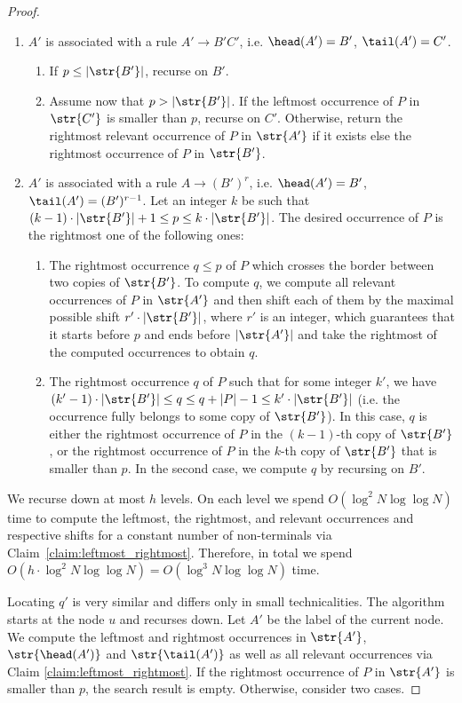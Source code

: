 \begin{proof}
\begin{enumerate}
\item $A'$ is associated with a rule $A' \rightarrow B'C'$, i.e. $\head(A') = B'$, $\tail(A') = C'$. 
\begin{enumerate}
\item If $p \le |\str{B'}|$, recurse on $B'$. 
\item Assume now that $p > |\str{B'}|$. If the leftmost  occurrence of $P$ in $\str{C'}$ is smaller than $p$, recurse on $C'$. Otherwise, return the rightmost relevant occurrence of $P$ in $\str{A'}$ if it exists else the rightmost occurrence of $P$ in $\str{B'}$. 
\end{enumerate}
\item $A'$ is associated with a rule $A \rightarrow (B')^r$, i.e. $\head(A') = B'$, $\tail(A') = (B')^{r-1}$.  Let an integer $k$ be such that $(k-1) \cdot |\str{B'}|+1 \le p \le k \cdot |\str{B'}|$. The desired occurrence of $P$ is the rightmost one of the following ones:
\begin{enumerate}
    \item The rightmost occurrence $q \le p$ of $P$ which crosses the border between two copies of $\str{B'}$. To compute $q$, we compute all relevant occurrences of $P$ in $\str{A'}$ and then shift each of them by the maximal possible shift $r' \cdot |\str{B'}|$, where $r'$ is an integer, which guarantees that it starts before $p$ and ends before $|\str{A'}|$ and take the rightmost of the computed occurrences to obtain $q$.
    \item The rightmost occurrence $q$ of $P$ such that for some integer $k'$, we have $(k'-1) \cdot |\str{B'}| \le q \le q+|P|-1 \le k' \cdot |\str{B'}|$ (i.e. the occurrence fully belongs to some copy of $\str{B'}$). In this case, $q$ is either the rightmost occurrence of $P$ in the $(k-1)$-th copy of $\str{B'}$, or the rightmost occurrence of $P$ in the $k$-th copy of $\str{B'}$ that is smaller than $p$. In the second case, we compute $q$ by recursing on $B'$.
    \end{enumerate}
\end{enumerate}
    We recurse down at most $h$ levels. On each level we spend $O(\log^{2} N\log\log N)$ time to compute the leftmost, the rightmost, and relevant occurrences and respective shifts for a constant number of non-terminals via Claim~\ref{claim:leftmost_rightmost}. Therefore, in total we spend $O(h \cdot \log^{2} N\log\log N) = O(\log^{3} N\log\log N)$ time. 
    
    
Locating $q'$ is very similar and differs only in small technicalities. The algorithm starts at the node $u$ and recurses down. Let $A'$ be the label of the current node. We compute the leftmost and rightmost occurrences in $\str{A'}$, $\str{\head(A')}$ and $\str{\tail(A')}$ as well as all relevant occurrences via Claim \ref{claim:leftmost_rightmost}. If the rightmost occurrence of $P$ in $\str{A'}$ is smaller than $p$, the search result is empty. Otherwise, consider two cases. 


\end{proof}
